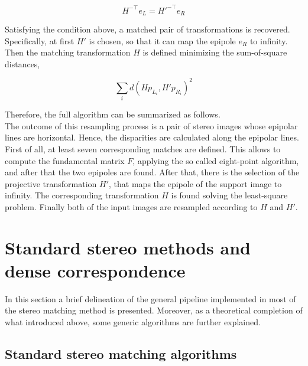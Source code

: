 \begin{equation}
	H^{-\top} e_L = H'^{-\top} e_R
\end{equation}

Satisfying the condition above, a matched pair of transformations is recovered.\\
Specifically, at first $H'$ is chosen, so that it can map the epipole $e_R$ to infinity. 
Then the matching transformation $H$ is defined minimizing the sum-of-square distances,

\begin{equation}
\label{eqn:match-transf-constr}
	\sum_i d(H p_{L_i}, H'p_{R_i})^2
\end{equation}

Therefore, the full algorithm can be summarized as follows.\\
The outcome of this resampling process is a pair of stereo images whose epipolar lines are horizontal.
Hence, the disparities are calculated along the epipolar lines. 
First of all, at least seven corresponding matches are defined.
This allows to compute the fundamental matrix $F$, applying the so called eight-point algorithm, and after that the two epipoles are found.
After that, there is the selection of the projective transformation $H'$, that maps the epipole of the support image to infinity.
The corresponding transformation $H$ is found solving the least-square problem.
Finally both of the input images are resampled according to $H$ and $H'$.

\section{Standard stereo methods and dense correspondence}
\label{section:stereo-methods}

In this section a brief delineation of the general pipeline implemented in most of the stereo matching method is presented. 
Moreover, as a theoretical completion of what introduced above, some generic algorithms are further explained.

\subsection{Standard stereo matching algorithms}
\label{subsection:standard-methods}


